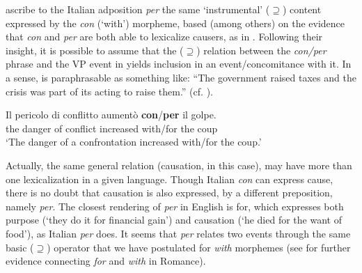 \documentclass[output=paper,modfonts,nonflat,newtxmath,colorlinks,citecolor=brown]{langsci/langscibook}
\begin{document}
\citet{FrancoManzini2017Ins} ascribe to the Italian adposition \textit{per} the same ‘instrumental’ (${\supseteq}$) content expressed by the \textit{con} (`with') morpheme, based (among others) on the evidence that \textit{con} and \textit{per} are both able to lexicalize causers, as in . Following their insight, it is possible to assume that the (${\supseteq}$) relation between the \textit{con/per} phrase and the VP event in  yields inclusion in an event/concomitance with it. In a sense,  is paraphrasable as something like: “The government raised taxes and the crisis was part of its acting to raise them.” (cf. \citealt[8--9]{FrancoManzini2017Ins}).

\ea%
    \label{ex:franco:24}
    \gll  Il pericolo di conflitto aumentò \textbf{con}/\textbf{per} il golpe.\\
        the danger of conflict increased with/for the coup\\
    \glt  ‘The danger of a confrontation increased with/for the coup.’
    \z

Actually, the same general relation (causation, in this case), may have more than one lexicalization in a given language. Though Italian \textit{con} can express cause, there is no doubt that causation is also expressed, by a different preposition, namely \textit{per}. The closest rendering of \textit{per} in English is {for}, which expresses both purpose (‘they do it for financial gain’) and causation (‘he died for the want of food’), as Italian \textit{per} does. It seems that \textit{per} relates two events through the same basic (${\supseteq}$) operator that we have postulated for \textit{with} morphemes (see \citealt[26--27]{FrancoManzini2017Ins} for further evidence connecting \textit{for} and \textit{with} in Romance).
\end{document}
